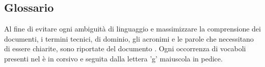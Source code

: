 \subsection{Glossario}
Al fine di evitare ogni ambiguità di linguaggio e massimizzare la comprensione dei documenti, 
i termini tecnici, di dominio, gli acronimi e le parole che necessitano di essere chiarite, sono 
riportate del documento \Glv{}. Ogni occorrenza di vocaboli presenti nel \Glv{} è in corsivo e 
seguita dalla lettera 'g' maiuscola in pedice.